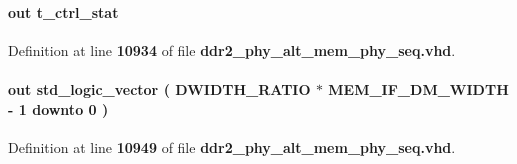 \paragraph[{dgwb\+\_\+ctrl}]{ {\bfseries \textcolor{keywordflow}{out}\textcolor{vhdlchar}{ }} {\bfseries {\bfseries {\bf t\+\_\+ctrl\+\_\+stat}} \textcolor{vhdlchar}{ }} \hspace{0.3cm}{\ttfamily [Port]}}\label{classddr2__phy__alt__mem__phy__dgwb_a38e62ef28ad4ec6c5fa0e0673c524848}


Definition at line {\bf 10934} of file {\bf ddr2\+\_\+phy\+\_\+alt\+\_\+mem\+\_\+phy\+\_\+seq.\+vhd}.

\paragraph[{dgwb\+\_\+dm}]{ {\bfseries \textcolor{keywordflow}{out}\textcolor{vhdlchar}{ }} {\bfseries \textcolor{comment}{std\+\_\+logic\+\_\+vector}\textcolor{vhdlchar}{ }\textcolor{vhdlchar}{(}\textcolor{vhdlchar}{ }\textcolor{vhdlchar}{ }\textcolor{vhdlchar}{ }\textcolor{vhdlchar}{ }{\bfseries {\bf D\+W\+I\+D\+T\+H\+\_\+\+R\+A\+T\+IO}} \textcolor{vhdlchar}{$\ast$}\textcolor{vhdlchar}{ }\textcolor{vhdlchar}{ }\textcolor{vhdlchar}{ }{\bfseries {\bf M\+E\+M\+\_\+\+I\+F\+\_\+\+D\+M\+\_\+\+W\+I\+D\+TH}} \textcolor{vhdlchar}{-\/}\textcolor{vhdlchar}{ } \textcolor{vhdldigit}{1} \textcolor{vhdlchar}{ }\textcolor{keywordflow}{downto}\textcolor{vhdlchar}{ }\textcolor{vhdlchar}{ } \textcolor{vhdldigit}{0} \textcolor{vhdlchar}{ }\textcolor{vhdlchar}{)}\textcolor{vhdlchar}{ }} \hspace{0.3cm}{\ttfamily [Port]}}\label{classddr2__phy__alt__mem__phy__dgwb_a12f8b6543b03e0dd1241ae758207aa73}


Definition at line {\bf 10949} of file {\bf ddr2\+\_\+phy\+\_\+alt\+\_\+mem\+\_\+phy\+\_\+seq.\+vhd}.

